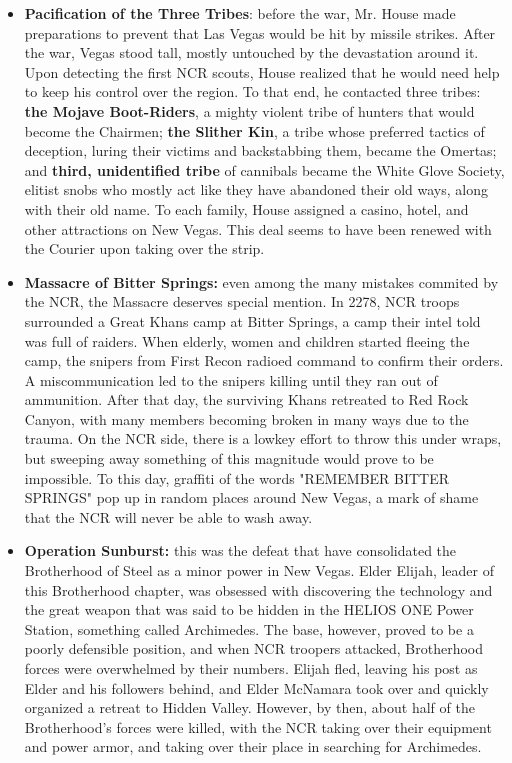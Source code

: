 \begin{itemize}
	\item \textbf{Pacification of the Three Tribes}: before the war, Mr. House made preparations to prevent that Las Vegas would be hit by missile strikes. After the war, Vegas stood tall, mostly untouched by the devastation around it. Upon detecting the first NCR scouts, House realized that he would need help to keep his control over the region. To that end, he contacted three tribes: \textbf{the Mojave Boot-Riders}, a mighty violent tribe of hunters that would become the Chairmen; \textbf{the Slither Kin}, a tribe whose preferred tactics of deception, luring their victims and backstabbing them, became the Omertas; and \textbf{third, unidentified tribe} of cannibals became the White Glove Society, elitist snobs who mostly act like they have abandoned their old ways, along with their old name. To each family, House assigned a casino, hotel, and other attractions on New Vegas. This deal seems to have been renewed with the Courier upon taking over the strip.
	
	\item \textbf{Massacre of Bitter Springs:} even among the many mistakes commited by the NCR, the Massacre deserves special mention. In 2278, NCR troops surrounded a Great Khans camp at Bitter Springs, a camp their intel told was full of raiders. When elderly, women and children started fleeing the camp, the snipers from First Recon radioed command to confirm their orders. A miscommunication led to the snipers killing until they ran out of ammunition. After that day, the surviving Khans retreated to Red Rock Canyon, with many members becoming broken in many ways due to the trauma. On the NCR side, there is a lowkey effort to throw this under wraps, but sweeping away something of this magnitude would prove to be impossible. To this day, graffiti of the words "REMEMBER BITTER SPRINGS" pop up in random places around New Vegas, a mark of shame that the NCR will never be able to wash away.
	
	\item \textbf{Operation Sunburst:} this was the defeat that have consolidated the Brotherhood of Steel as a minor power in New Vegas. Elder Elijah, leader of this Brotherhood chapter, was obsessed with discovering the technology and the great weapon that was said to be hidden in the HELIOS ONE Power Station, something called Archimedes. The  base, however, proved to be a poorly defensible position, and when NCR troopers attacked, Brotherhood forces were overwhelmed by their numbers. Elijah fled, leaving his post as Elder and his followers behind, and Elder McNamara took over and quickly organized a retreat to Hidden Valley. However, by then, about half of the Brotherhood's forces were killed, with the NCR taking over their equipment and power armor, and taking over their place in searching for Archimedes.
	

\end{itemize}
